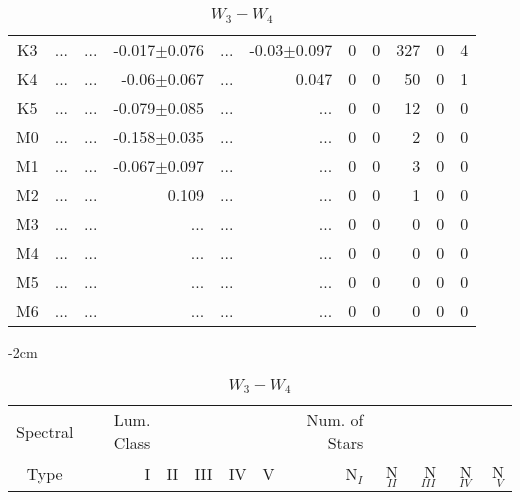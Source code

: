 \begin{table}[t]
\begin{table}[t]
\begin{center}
\begin{tabular}{c|rrrrr|rrrrr}
    K3	&	 ...	&	 ...	&	-0.017$\pm$0.076	&	 ...	&	-0.03$\pm$0.097	&	0	&	0	&	327	&	0	&	4	\\
    K4	&	 ...	&	 ...	&	-0.06$\pm$0.067	&	 ...	&	0.047	&	0	&	0	&	50	&	0	&	1	\\
    K5	&	 ...	&	 ...	&	-0.079$\pm$0.085	&	 ...	&	 ...	&	0	&	0	&	12	&	0	&	0	\\
    M0	&	 ...	&	 ...	&	-0.158$\pm$0.035	&	 ...	&	 ...	&	0	&	0	&	2	&	0	&	0	\\
    M1	&	 ...	&	 ...	&	-0.067$\pm$0.097	&	 ...	&	 ...	&	0	&	0	&	3	&	0	&	0	\\
    M2	&	 ...	&	 ...	&	0.109	&	 ...	&	 ...	&	0	&	0	&	1	&	0	&	0	\\
    M3	&	 ...	&	 ...	&	 ...	&	 ...	&	 ...	&	0	&	0	&	0	&	0	&	0	\\
    M4	&	 ...	&	 ...	&	 ...	&	 ...	&	 ...	&	0	&	0	&	0	&	0	&	0	\\
    M5	&	 ...	&	 ...	&	 ...	&	 ...	&	 ...	&	0	&	0	&	0	&	0	&	0	\\
    M6	&	 ...	&	 ...	&	 ...	&	 ...	&	 ...	&	0	&	0	&	0	&	0	&	0	\\
        \bottomrule
        \end{tabular}
    \end{center}
    \end{table}
    
    
    \begin{table}[t]
    \tiny
    \centering
    \caption{$W_{3}-W_{4}$}
    \begin{center}
        \addtolength{\leftskip} {-2cm}
        \addtolength{\rightskip}{-2cm}
        \begin{tabular}{c|rrrrr|rrrrr}
        \toprule
        Spectral & Lum. Class & & & & & Num. of Stars & & & &  \\
        Type & I & II & III &  IV & V & N$_{I}$ & N$_{II}$ & N$_{III}$ & N$_{IV}$ & N$_{V}$ \\ \midrule
      

\end{tabular}
\end{center}
\end{table}
\end{table}
